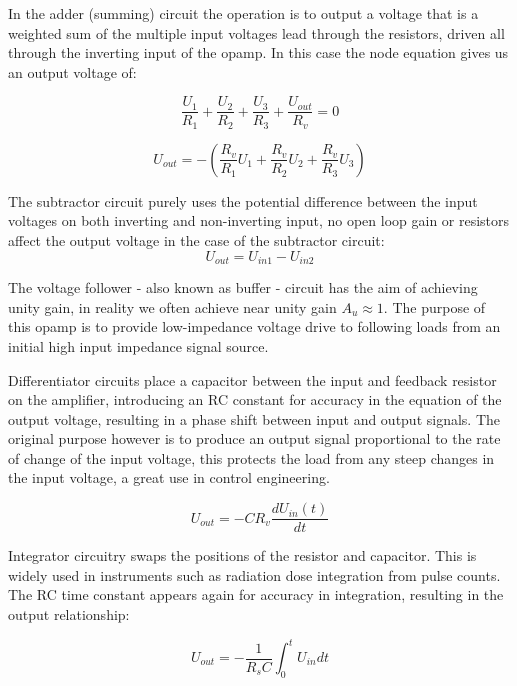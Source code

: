 \documentclass[12pt]{article}
\begin{document}
In the adder (summing) circuit the operation is to output a voltage that is a weighted sum of the multiple input voltages lead through the resistors, driven all through the inverting input of the opamp. In this case the node equation gives us an output voltage of:

\begin{equation}
    \frac{U_1}{R_1}+\frac{U_2}{R_2}+\frac{U_3}{R_3}+\frac{U_{out}}{R_v}=0
    \label{eq:adder}
\end{equation}

\begin{equation}
    U_{out}= -\left( \frac{R_v}{R_1} U_1+\frac{R_v}{R_2} U_2+\frac{R_v}{R_3} U_3\right)
    \label{eq:out_adder}
\end{equation}


The subtractor circuit purely uses the potential difference between the input voltages on both inverting and non-inverting input, no open loop gain or resistors affect the output voltage in the case of the subtractor circuit:
\begin{equation}
    U_{out}= U_{in1} - U_{in2}
\end{equation}

The voltage follower - also known as buffer - circuit has the aim of achieving unity gain, in reality we often achieve near unity gain $A_u\approx1$. The purpose of this opamp is to provide low-impedance voltage drive to following loads from an initial high input impedance signal source.

Differentiator circuits place a capacitor between the input and feedback resistor on the amplifier, introducing an RC constant for accuracy in the equation of the output voltage, resulting in a phase shift between input and output signals. The original purpose however is to produce an output signal proportional to the rate of change of the input voltage, this protects the load from any steep changes in the input voltage, a great use in control engineering.

\begin{equation}
    U_{out}= -CR_v \frac{dU_{in}(t)}{dt}
    \label{eq:diff_out}
\end{equation}

Integrator circuitry swaps the positions of the resistor and capacitor. This is widely used in instruments such as radiation dose integration from pulse counts. The RC time constant appears again for accuracy in integration, resulting in the output relationship:

\begin{equation}
    U_{out}= -\frac{1}{R_sC}\int_{0}^{t}U_{in}dt
    \label{equ:integration}
\end{equation}
\end{document}
